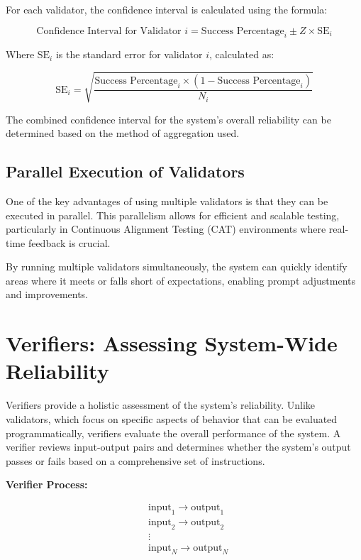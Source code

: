 \documentclass{article}
\begin{document}
For each validator, the confidence interval is calculated using the formula:

\begin{equation*}
\text{Confidence Interval for Validator } i = \text{Success Percentage}_i \pm Z \times \text{SE}_i
\end{equation*}

Where \( \text{SE}_i \) is the standard error for validator \( i \), calculated as:

\begin{equation*}
\text{SE}_i = \sqrt{\frac{\text{Success Percentage}_i \times (1 - \text{Success Percentage}_i)}{N_i}}
\end{equation*}

The combined confidence interval for the system’s overall reliability can be determined based on the method of aggregation used.

\subsection{Parallel Execution of Validators}

One of the key advantages of using multiple validators is that they can be executed in parallel. This parallelism allows for efficient and scalable testing, particularly in Continuous Alignment Testing (CAT) environments where real-time feedback is crucial.

By running multiple validators simultaneously, the system can quickly identify areas where it meets or falls short of expectations, enabling prompt adjustments and improvements.

\section{Verifiers: Assessing System-Wide Reliability}

Verifiers provide a holistic assessment of the system's reliability. Unlike validators, which focus on specific aspects of behavior that can be evaluated programmatically, verifiers evaluate the overall performance of the system. A verifier reviews input-output pairs and determines whether the system's output passes or fails based on a comprehensive set of instructions.

\textbf{Verifier Process:}

\begin{equation*}
\begin{aligned}
&\text{input}_1 \rightarrow \text{output}_1 \\
&\text{input}_2 \rightarrow \text{output}_2 \\
&\vdots \\
&\text{input}_N \rightarrow \text{output}_N 
\end{aligned}
\end{equation*}
\end{document}
